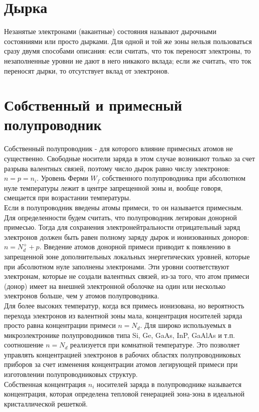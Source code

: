 \begin{multicols*}{2}
		\section{Дырка}
		Незанятые электронами (вакантные) состояния называют дырочными состояниями или просто дырками. Для одной и той же зоны нельзя пользоваться сразу двумя способами описания: если считать, что ток переносят электроны, то незаполненные уровни не дают в него никакого вклада; если же считать, что ток переносят дырки, то отсутствует вклад от электронов.

		\section{Собственный и примесный полупроводник}
		Собственный полупроводник - для которого влияние примесных атомов не существенно. Свободные носители заряда в этом случае возникают только за счет разрыва валентных связей, поэтому число дырок равно числу электронов: $n = p = n_i$. Уровень Ферми $W_f$ собственного полупроводника при абсолютном нуле
		температуры лежит в центре запрещенной зоны и, вообще говоря, смещается при возрастании температуры.\\ 
		Если в полупроводник введены атомы примеси, то он называется примесным. Для определенности будем считать, что полупроводник легирован донорной примесью. Тогда для сохранения электронейтральности отрицательный заряд электронов должен быть равен полному заряду дырок и ионизованных доноров: $n = N^+_d + p$. Введение атомов донорной примеси приводит к появлению в запрещенной зоне дополнительных локальных энергетических уровней, которые при абсолютном нуле заполнены электронами. Эти уровни соответствуют электронам, которые не создали валентных связей, из-за того, что атом примеси (донор) имеет на внешней электронной оболочке на один или несколько электронов больше, чем у атомов полупроводника.\\
		Для более высоких температур, когда вся примесь ионизована, но вероятность перехода электронов из валентной зоны мала, концентрация носителей
		заряда просто равна концентрации примеси $n=N_d$. Для широко используемых в микроэлектронике полупроводников типа Si, Ge, GaAs, InP, GaAlAs и т.п. соотношение $n=N_d$ реализуется при комнатной температуре. Это позволяет управлять концентрацией электронов в рабочих областях полупроводниковых приборов за счет изменения концентрации атомов легирующей примеси при изготовлении полупроводниковых структур.\\
		Собственная концентрация $n_i$ носителей заряда в полупроводнике называется концентрация, которая определена тепловой генерацией зона-зона в идеальной кристаллической решеткой.


\end{multicols*}
